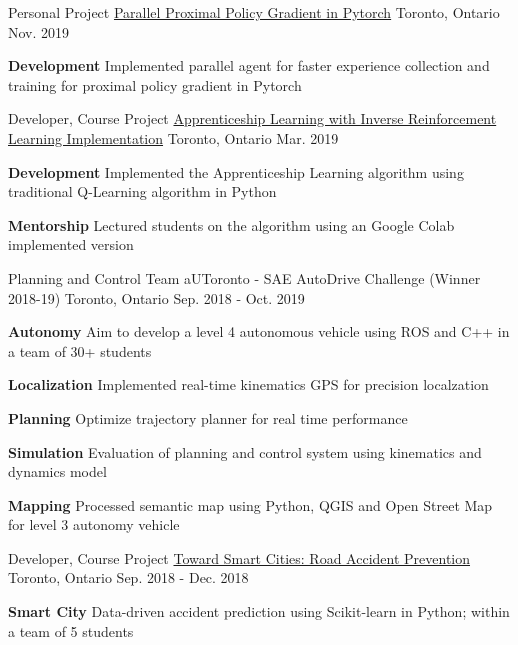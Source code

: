 \begin{cventries}
	\cventry
	{Personal Project}
	{\href{https://github.com/rhklite/Parallel-PPO-PyTorch}{Parallel Proximal Policy Gradient in Pytorch}}
	{Toronto, Ontario}
	{Nov. 2019}
	{
		\begin{cvitems}
			\item {\textbf{Development} Implemented parallel agent for faster experience collection and training for proximal policy gradient in Pytorch}
		\end{cvitems}
	}
	\cventry
	{Developer, Course Project}
	{\href{https://github.com/rhklite/apprenticeship_inverse_RL}{Apprenticeship Learning with Inverse Reinforcement Learning Implementation}}
	{Toronto, Ontario}
	{Mar. 2019}
	{
		\begin{cvitems}
			\item {\textbf{Development} {Implemented the Apprenticeship Learning algorithm using traditional Q-Learning algorithm in Python}}
			\item {\textbf{Mentorship} {Lectured students on the algorithm using an Google Colab implemented version}}
		\end{cvitems}
	}
	\cventry
	{Planning and Control Team}
	{aUToronto - SAE AutoDrive Challenge (Winner 2018-19)}
	{Toronto, Ontario}
	{Sep. 2018 - Oct. 2019}
	{
		\begin{cvitems}
			\item {\textbf{Autonomy} Aim to develop a level 4 autonomous vehicle using ROS and C++ in a team of 30+ students}
			\item {\textbf{Localization} Implemented real-time kinematics GPS for precision localzation
			}
			\item {\textbf{Planning} Optimize trajectory planner for real time performance		
			}
			\item {\textbf{Simulation} Evaluation of planning and control system using kinematics and dynamics model
			}
			\item {\textbf{Mapping} Processed semantic map using Python, QGIS and Open Street Map for level 3 autonomy vehicle}
		\end{cvitems}
	}
	\cventry
	{Developer, Course Project}
	{\href{https://github.com/rhklite/traffic_accident_prediction}{Toward Smart Cities: Road Accident Prevention}}
	{Toronto, Ontario}
	{Sep. 2018 - Dec. 2018}
	{
		\begin{cvitems}
			\item {\textbf{Smart City} Data-driven accident prediction using Scikit-learn in Python; within a team of 5 students}

\end{cvitems}}
\end{cventries}
